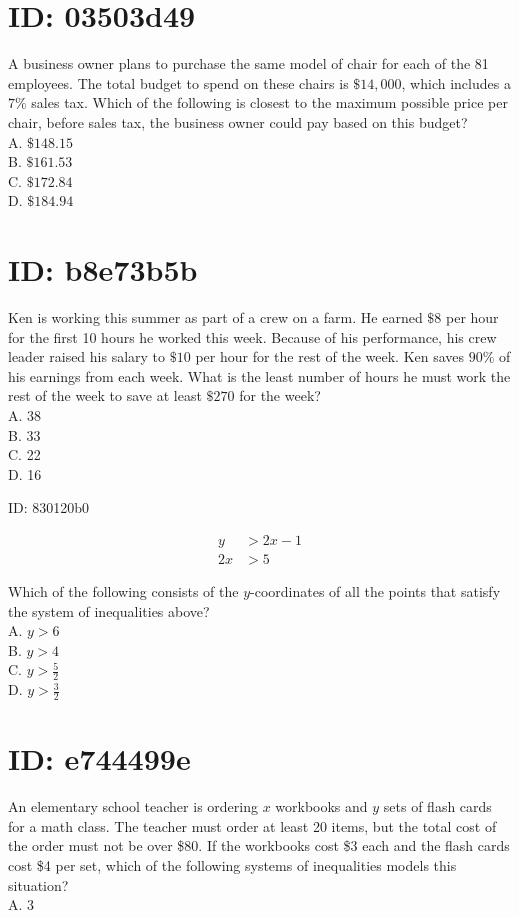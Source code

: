 \section*{ID: 03503d49}
A business owner plans to purchase the same model of chair for each of the 81 employees. The total budget to spend on these chairs is $\$ 14,000$, which includes a $7 \%$ sales tax. Which of the following is closest to the maximum possible price per chair, before sales tax, the business owner could pay based on this budget?\\
A. $\$ 148.15$\\
B. $\$ 161.53$\\
C. $\$ 172.84$\\
D. $\$ 184.94$

\section*{ID: b8e73b5b}
Ken is working this summer as part of a crew on a farm. He earned $\$ 8$ per hour for the first 10 hours he worked this week. Because of his performance, his crew leader raised his salary to $\$ 10$ per hour for the rest of the week. Ken saves $90 \%$ of his earnings from each week. What is the least number of hours he must work the rest of the week to save at least $\$ 270$ for the week?\\
A. 38\\
B. 33\\
C. 22\\
D. 16

ID: 830120b0

$$
\begin{aligned}
y & >2 x-1 \\
2 x & >5
\end{aligned}
$$

Which of the following consists of the $y$-coordinates of all the points that satisfy the system of inequalities above?\\
A. $y>6$\\
B. $y>4$\\
C. $y>\frac{5}{2}$\\
D. $y>\frac{3}{2}$

\section*{ID: e744499e}
An elementary school teacher is ordering $x$ workbooks and $y$ sets of flash cards for a math class. The teacher must order at least 20 items, but the total cost of the order must not be over \$80. If the workbooks cost \$3 each and the flash cards cost \$4 per set, which of the following systems of inequalities models this situation?\\
A. 3

